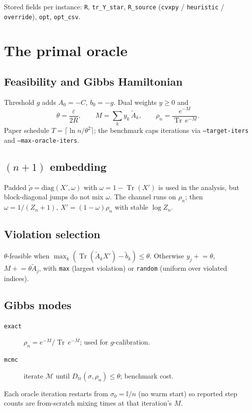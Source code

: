 \documentclass[11pt]{article}
\newcommand{\Tr}{\operatorname{Tr}}
\newcommand{\id}{\mathbb{I}}
\newcommand{\eps}{\varepsilon}
\newcommand{\dist}{D_{\mathrm{tr}}}
\begin{document}
Stored fields per instance: \texttt{R}, \texttt{tr\_Y\_star}, \texttt{R\_source}
(\texttt{cvxpy} / \texttt{heuristic} / \texttt{override}), \texttt{opt},
\texttt{opt\_csv}.

\section{The primal oracle}
\label{sec:oracle}

\subsection{Feasibility and Gibbs Hamiltonian}
Threshold $g$ adds $A_0=-C$, $b_0=-g$. Dual weights $y\ge 0$ and
\begin{equation}
\theta=\frac{\eps}{2R},\qquad
M=\sum_k y_k\,\tilde A_k,\qquad
\rho_n=\frac{e^{-M}}{\Tr\,e^{-M}}.
\end{equation}
Paper schedule $T=\lceil\ln n/\theta^2\rceil$; the benchmark caps iterations via
\texttt{--target-iters} and \texttt{--max-oracle-iters}.

\subsection{$(n{+}1)$ embedding}
Padded $\tilde\rho=\mathrm{diag}(X',\omega)$ with $\omega=1-\Tr(X')$ is used in
the analysis, but block-diagonal jumps do not mix $\omega$. The channel runs on
$\rho_n$; then
$\omega=1/(Z_n+1)$, $X'=(1-\omega)\rho_n$ with stable $\log Z_n$.

\subsection{Violation selection}
$\theta$-feasible when $\max_k(\Tr(\tilde A_k X')-\tilde b_k)\le\theta$.
Otherwise $y_j\mathrel{+}=\theta$, $M\mathrel{+}=\theta\tilde A_j$, with
\texttt{max} (largest violation) or \texttt{random} (uniform over violated
indices).

\subsection{Gibbs modes}
\begin{description}
  \item[\texttt{exact}] $\rho_n=e^{-M}/\Tr\,e^{-M}$; used for $g$-calibration.
  \item[\texttt{mcmc}] iterate $\mathcal{M}$ until
  $\dist(\sigma,\rho_n)\le\theta$; benchmark cost.
\end{description}
Each oracle iteration restarts from $\sigma_0=\id/n$ (no warm start) so reported
step counts are from-scratch mixing times at that iteration's $M$.
\end{document}
